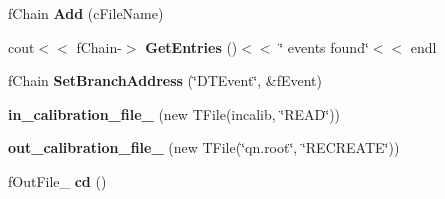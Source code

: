 \begin{DoxyCompactItemize}
\item 
\mbox{\label{namespaceQn_a3bd8bc441e4dbc17b9f8cdf78dbf9a6d}} 
f\+Chain {\bfseries Add} (c\+File\+Name)
\item 
\mbox{\label{namespaceQn_adaa2d721ae210c89c87c31155d2b23ca}} 
cout$<$$<$ f\+Chain-\/$>$ {\bfseries Get\+Entries} ()$<$$<$ \char`\"{} events found\char`\"{}$<$$<$ endl
\item 
\mbox{\label{namespaceQn_ae22d17ecea828bfe87403bd3535a6c85}} 
f\+Chain {\bfseries Set\+Branch\+Address} (\char`\"{}D\+T\+Event\char`\"{}, \&f\+Event)
\item 
\mbox{\label{namespaceQn_a414a024bdc3aa5940f8aa55a314057a4}} 
{\bfseries in\+\_\+calibration\+\_\+file\+\_\+} (new T\+File(incalib, \char`\"{}R\+E\+AD\char`\"{}))
\item 
\mbox{\label{namespaceQn_a40037dd6c0f8f93962c767d0b2451a61}} 
{\bfseries out\+\_\+calibration\+\_\+file\+\_\+} (new T\+File(\char`\"{}qn.\+root\char`\"{}, \char`\"{}R\+E\+C\+R\+E\+A\+TE\char`\"{}))
\item 
\mbox{\label{namespaceQn_ac2be62789dd19888145989f7e571d4ac}} 
f\+Out\+File\+\_\+ {\bfseries cd} ()
\end{DoxyCompactItemize}
